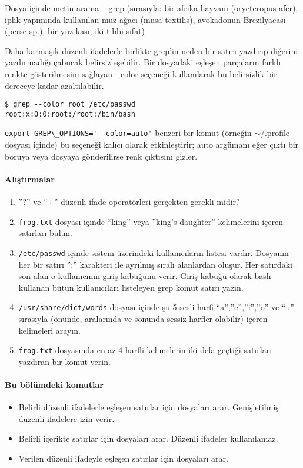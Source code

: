 \begin{section}{Dosya içinde metin arama – grep}
(sırasıyla: bir afrika hayvanı (orycteropus afer), iplik yapımında kullanılan muz ağacı (musa textilis), avokadonun Brezilyacası (perse sp.), bir yüz kası, iki tıbbi sıfat)

Daha karmaşık düzenli ifadelerle birlikte grep'in neden bir satırı yazdırıp diğerini yazdırmadığı çabucak belirsizleşebilir. Bir dosyadaki eşleşen parçaların farklı renkte gösterilmesini sağlayan -{}-color seçeneği kullanılarak bu belirsizlik bir dereceye kadar azaltılabilir.
\footnotesize
\begin{verbatim}
$ grep --color root /etc/passwd
root:x:0:0:root:/root:/bin/bash
\end{verbatim}
\normalsize

\verb|export GREP\_OPTIONS='--color=auto'| benzeri bir komut (örneğin $\sim$/.profile dosyası içinde) bu seçeneği kalıcı olarak etkinleştirir; auto argümanı eğer çıktı bir boruya veya dosyaya gönderilirse renk çıktısını gizler.

\paragraph{{\Huge{\PencilLeftDown}}Alıştırmalar}{
\begin{enumerate}
 \item ”?” ve “+” düzenli ifade operatörleri gerçekten gerekli midir?
 \item \verb|frog.txt| dosyası içinde “king” veya ”king’s daughter” kelimelerini içeren satırları bulun.
 \item \verb|/etc/passwd| içinde sistem üzerindeki kullanıcıların listesi vardır. Dosyanın her bir satırı ”:” karakteri ile ayrılmış sıralı alanlardan oluşur. Her satırdaki son alan o kullanıcının giriş kabuğunu verir. Giriş kabuğu olarak bash kullanan bütün kullanıcıları listeleyen grep komut satırı yazın.
 \item \verb|/usr/share/dict/words| dosyası içinde şu 5 sesli harfi “a”,”e”,”i”,”o” ve “u” sırasıyla (önünde, aralarında ve sonunda sessiz harfler olabilir) içeren kelimeleri arayın.
 \item \verb|frog.txt| dosyasında en az 4 harfli kelimelerin iki defa geçtiği satırları yazdıran bir komut verin.
\end{enumerate}}

\paragraph{Bu bölümdeki komutlar}{
\begin{itemize}
 \item[egrep]Belirli düzenli ifadelerle eşleşen satırlar için dosyaları arar. Genişletilmiş düzenli ifadelere izin verir.
 \item[fgrep]Belirli içerikte satırlar için dosyaları arar. Düzenli ifadeler kullanılamaz.
 \item[grep]Verilen düzenli ifadeyle eşleşen satırlar için dosyaları arar.
\end{itemize}}


\end{section}
